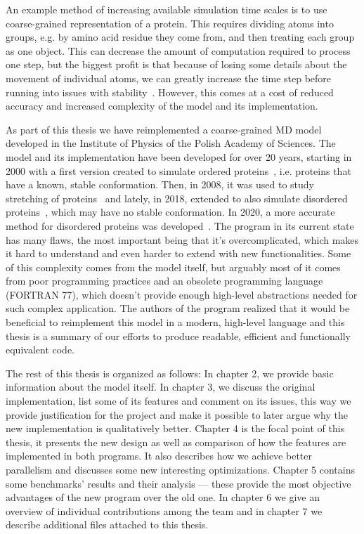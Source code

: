 An example method of increasing available simulation time scales is to use coarse-grained representation of a protein. 
This requires dividing atoms into groups, e.g. by amino acid residue they come from, and then treating each group as one object. 
This can decrease the amount of computation required to process one step, but the biggest profit is that  
because of losing some details about the movement of individual atoms, we can greatly increase the time step 
before running into issues with stability~\cite{md_aa}. However, this comes at a cost of reduced accuracy
and increased complexity of the model and its implementation.


As part of this thesis we have reimplemented a coarse-grained MD model developed in the Institute of Physics of the Polish Academy of Sciences. The model and its implementation have been developed for over 20 years, starting in 2000 with a first version created to simulate ordered proteins~\cite{cg_1}, i.e. proteins that have a known, stable conformation. Then, in 2008, it was used to study stretching of proteins~\cite{cg_2} and lately, in 2018, extended to also simulate disordered proteins~\cite{QA_model}, which may have no stable conformation. In 2020, a more accurate method for disordered proteins was developed~\cite{PID}. The program in its current state has many flaws, the most important being that it's overcomplicated, which makes it hard to understand and even harder to extend with new functionalities. Some of this complexity comes from the model itself, but arguably most of it comes from poor programming practices and an obsolete programming language (FORTRAN 77), which doesn't provide enough high-level abstractions needed for such complex application. The authors of the program realized that it would be beneficial to reimplement this model in a modern, high-level language and this thesis is a summary of our efforts to produce readable, efficient and functionally equivalent code.


The rest of this thesis is organized as follows: In chapter 2, we provide basic information about the model itself. In chapter 3, we discuss the original implementation, list some of its features and comment on its issues, this way we provide justification for the project and make it possible to later argue why the new implementation is qualitatively better. Chapter 4 is the focal point of this thesis, it presents the new design as well as comparison of how the features are implemented in both programs. It also describes how we achieve better parallelism and discusses some new interesting optimizations. Chapter 5 contains some benchmarks' results and their analysis --- these provide the most objective advantages of the new program over the old one. In chapter 6 we give an overview of individual contributions among the team and in chapter 7 we describe additional files attached to this thesis. 